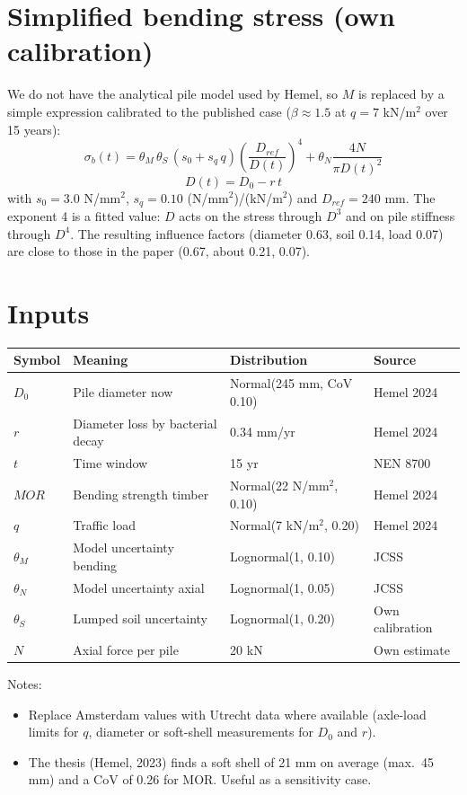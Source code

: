 \section{Simplified bending stress (own calibration)}
We do not have the analytical pile model used by Hemel, so $M$ is replaced by a simple expression calibrated to the published case ($\beta \approx 1.5$ at $q = 7$ kN/m$^2$ over 15 years):
\begin{equation}
\sigma_b(t) = \theta_M\,\theta_S\,(s_0 + s_q\,q)\left(\frac{D_{ref}}{D(t)}\right)^4 + \theta_N \frac{4N}{\pi D(t)^2}
\end{equation}
\begin{equation}
D(t) = D_0 - r\,t
\end{equation}
with $s_0 = 3.0$ N/mm$^2$, $s_q = 0.10$ (N/mm$^2$)/(kN/m$^2$) and $D_{ref} = 240$ mm. The exponent 4 is a fitted value: $D$ acts on the stress through $D^3$ and on pile stiffness through $D^4$. The resulting influence factors (diameter 0.63, soil 0.14, load 0.07) are close to those in the paper (0.67, about 0.21, 0.07).

\section{Inputs}
\begin{tabular}{llll}
\toprule
Symbol & Meaning & Distribution & Source \\
\midrule
$D_0$ & Pile diameter now & Normal(245 mm, CoV 0.10) & Hemel 2024 \\
$r$ & Diameter loss by bacterial decay & 0.34 mm/yr & Hemel 2024 \\
$t$ & Time window & 15 yr & NEN 8700 \\
$MOR$ & Bending strength timber & Normal(22 N/mm$^2$, 0.10) & Hemel 2024 \\
$q$ & Traffic load & Normal(7 kN/m$^2$, 0.20) & Hemel 2024 \\
$\theta_M$ & Model uncertainty bending & Lognormal(1, 0.10) & JCSS \\
$\theta_N$ & Model uncertainty axial & Lognormal(1, 0.05) & JCSS \\
$\theta_S$ & Lumped soil uncertainty & Lognormal(1, 0.20) & Own calibration \\
$N$ & Axial force per pile & 20 kN & Own estimate \\
\bottomrule
\end{tabular}

Notes:
\begin{itemize}
  \item Replace Amsterdam values with Utrecht data where available (axle-load limits for $q$, diameter or soft-shell measurements for $D_0$ and $r$).
  \item The thesis (Hemel, 2023) finds a soft shell of 21 mm on average (max.\ 45 mm) and a CoV of 0.26 for MOR. Useful as a sensitivity case.
\end{itemize}

